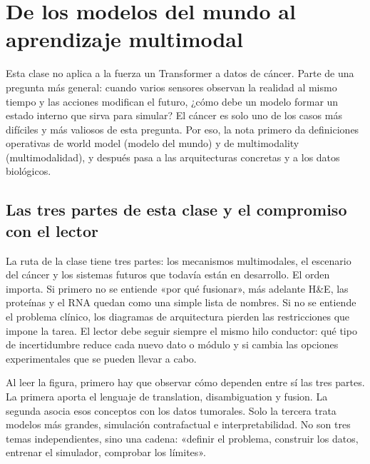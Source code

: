 \section{De los modelos del mundo al aprendizaje multimodal}

Esta clase no aplica a la fuerza un Transformer a datos de cáncer. Parte de una pregunta más general: cuando varios sensores observan la realidad al mismo tiempo y las acciones modifican el futuro, ¿cómo debe un modelo formar un estado interno que sirva para simular? El cáncer es solo uno de los casos más difíciles y más valiosos de esta pregunta. Por eso, la nota primero da definiciones operativas de world model (modelo del mundo) y de multimodality (multimodalidad), y después pasa a las arquitecturas concretas y a los datos biológicos.

\subsection{Las tres partes de esta clase y el compromiso con el lector}

La ruta de la clase tiene tres partes: los mecanismos multimodales, el escenario del cáncer y los sistemas futuros que todavía están en desarrollo. El orden importa. Si primero no se entiende «por qué fusionar», más adelante H\&E, las proteínas y el RNA quedan como una simple lista de nombres. Si no se entiende el problema clínico, los diagramas de arquitectura pierden las restricciones que impone la tarea. El lector debe seguir siempre el mismo hilo conductor: qué tipo de incertidumbre reduce cada nuevo dato o módulo y si cambia las opciones experimentales que se pueden llevar a cabo.


Al leer la figura, primero hay que observar cómo dependen entre sí las tres partes. La primera aporta el lenguaje de translation, disambiguation y fusion. La segunda asocia esos conceptos con los datos tumorales. Solo la tercera trata modelos más grandes, simulación contrafactual e interpretabilidad. No son tres temas independientes, sino una cadena: «definir el problema, construir los datos, entrenar el simulador, comprobar los límites».


